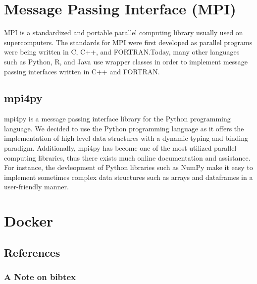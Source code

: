 
\section{Message Passing Interface (MPI)}

	MPI is a standardized and portable parallel computing library usually used on supercomputers. The standards for MPI were first developed as parallel programs were being written in C, C++, and FORTRAN.Today, many other languages such as Python, R, and Java use wrapper classes in order to implement message passing interfaces written in C++ and FORTRAN.

\subsection{mpi4py}
	mpi4py is a message passing interface library for the Python programming language. We decided to use the Python programming language as it offers the implementation of high-level data structures with a dynamic typing and binding paradigm. Additionally, mpi4py has become one of the most utilized parallel computing libraries, thus there exists much online documentation and assistance. For instance, the devleopment of Python libraries such as NumPy make it easy to implement sometimes complex data structures such as arrays and dataframes in a user-friendly manner.
	



\section{Docker}



\subsection{References}



\subsubsection{A Note on bibtex}

